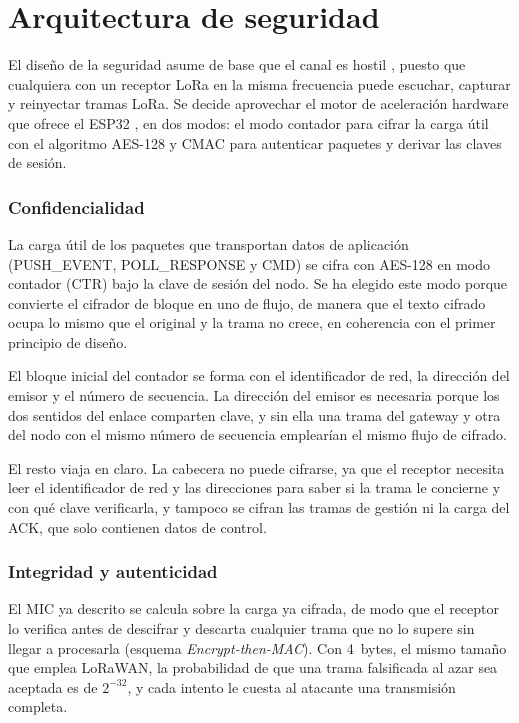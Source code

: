 \section{Arquitectura de seguridad}\label{sec:seguridad}

El diseño de la seguridad asume de base que el canal es hostil \cite{chacko2018security}, puesto que cualquiera con un receptor LoRa en la misma frecuencia puede escuchar, capturar y reinyectar tramas LoRa. Se decide aprovechar el motor de aceleración hardware que ofrece el ESP32 \cite{babiuch2019esp32}, en dos modos: el modo contador para cifrar la carga útil con el algoritmo AES-128 y CMAC para autenticar paquetes y derivar las claves de sesión.

\subsubsection{Confidencialidad}

La carga útil de los paquetes que transportan datos de aplicación (PUSH\_EVENT, POLL\_RESPONSE y CMD) se cifra con AES-128 en modo contador (CTR) \cite{nist80038a} bajo la clave de sesión del nodo. Se ha elegido este modo porque convierte el cifrador de bloque en uno de flujo, de manera que el texto cifrado ocupa lo mismo que el original y la trama no crece, en coherencia con el primer principio de diseño.

El bloque inicial del contador se forma con el identificador de red, la dirección del emisor y el número de secuencia. La dirección del emisor es necesaria porque los dos sentidos del enlace comparten clave, y sin ella una trama del gateway y otra del nodo con el mismo número de secuencia emplearían el mismo flujo de cifrado.

El resto viaja en claro. La cabecera no puede cifrarse, ya que el receptor necesita leer el identificador de red y las direcciones para saber si la trama le concierne y con qué clave verificarla, y tampoco se cifran las tramas de gestión ni la carga del ACK, que solo contienen datos de control.

\subsubsection{Integridad y autenticidad}\label{sec:integridad}

El MIC ya descrito se calcula sobre la carga ya cifrada, de modo que el receptor lo verifica antes de descifrar y descarta cualquier trama que no lo supere sin llegar a procesarla (esquema \textit{Encrypt-then-MAC}). Con 4~bytes, el mismo tamaño que emplea LoRaWAN, la probabilidad de que una trama falsificada al azar sea aceptada es de $2^{-32}$, y cada intento le cuesta al atacante una transmisión completa.

